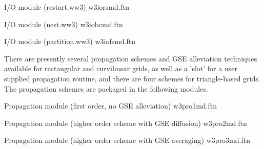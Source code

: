 \noindent
I/O module ({\file restart.ww3}) \hfill {\file w3iorsmd.ftn}

\begin{flisti}
\end{flisti}

\noindent
I/O module ({\file nest.ww3}) \hfill {\file w3iobcmd.ftn}

\begin{flisti}
\end{flisti}

\noindent
I/O module ({\file partition.ww3}) \hfill {\file w3iofsmd.ftn}

\begin{flisti}
\end{flisti}

\noindent
There are presently several propagation schemes and GSE alleviation techniques
available for rectangular and curvilinear grids, as well as a 'slot' for a
user supplied propagation routine, and there are four schemes for
triangle-based grids. The propagation schemes are packaged in the following
modules.

\vspace{\baselineskip} \noindent
Propagation module (first order, no GSE alleviation) \hfill {\file w3pro1md.ftn}

\begin{flisti}
\end{flisti}

\noindent
Propagation module (higher order scheme with GSE diffusion) \hfill {\file
  w3pro2md.ftn}

\begin{flisti}
\end{flisti}

\noindent
Propagation module (higher order scheme with GSE averaging) \hfill {\file
  w3pro3md.ftn}

\begin{flisti}
\end{flisti}

